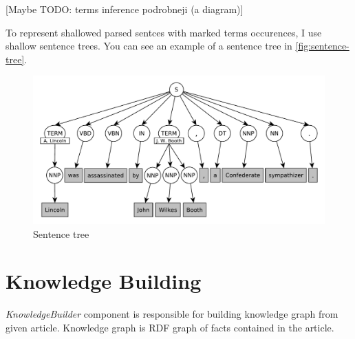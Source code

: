 \documentclass[a4paper, 12pt, twoside]{fithesis2}		%
\renewcommand{\_}{\leavevmode \kern0.0em\vbox{\hrule width0.4em}}
\begin{document}

[Maybe TODO: terms inference podrobneji (a diagram)]

To represent shallowed parsed sentces with marked terms occurences,
I use shallow sentence trees.
You can see an example of a sentence tree in \autoref{fig:sentence-tree}.

\begin{figure}[h]
  \centering
  \includegraphics[width=\textwidth]{images/sentence-tree.pdf}
  \caption{Sentence tree}
  \label{fig:sentence-tree}
\end{figure}

\section{Knowledge Building}
\label{sec:smartoo-knowledge}

\textit{KnowledgeBuilder} component is responsible for building knowledge graph from given article.
Knowledge graph is RDF graph of facts contained in the article.
\end{document}
